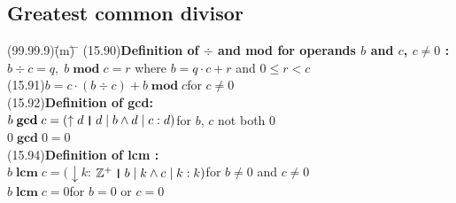 \documentclass{amsart}
\newcommand{\lgap}{2pt}                             %
\newcommand{\llgap}{6pt}                            %
\newcommand{\mymod}{\;\textbf{mod}\;}
\newcommand{\mygcd}{\;\textbf{gcd}\;}
\newcommand{\mylcm}{\;\textbf{lcm}\;}
\newcommand{\thedr}{\rule[-.25ex]{.32mm}{1.75ex}}   %
\newcommand{\dr}{\;\,\thedr\,\;}                    %
\newcommand{\rb}{:}                                 %
\begin{document}
\subsection*{Greatest common divisor}
\begin{tabbing}
(99.99.9)\;\=(m)\;\= \makebox[2in]{ } \= \kill
(15.90)\>\textbf{Definition of $\div$ and mod for operands $b$ and $c$, $c\ne 0$ :}\\[\lgap]
       \> $b \div c = q, \; b \mymod c = r$ \quad where $b = q\cdot c + r$ and $0 \le r < c$\\[\lgap]
(15.91)\>$b = c\cdot (b \div c) + b \mymod c$\quad for $c\ne 0$\\[\llgap]
(15.92)\>\textbf{Definition of gcd:}\\[\lgap]
       \> $b \mygcd c = (\uparrow d\dr d \mid b \land d \mid c \rb d)$\quad for $b$, $c$ not both 0\\[\lgap]
       \> $0 \mygcd 0 = 0$\\[\lgap]
(15.94)\>\textbf{Definition of lcm :}\\[\lgap]
       \> $b \mylcm c = (\downarrow k$: $\mathbb{Z}^{+}\dr b\mid k \land c \mid k \rb k)$\quad for $b\ne 0$ and $c\ne 0$\\[\lgap]
       \> $b \mylcm c = 0$\quad for $b=0$ or $c=0$\\[\lgap]
\end{tabbing}
\end{document}
